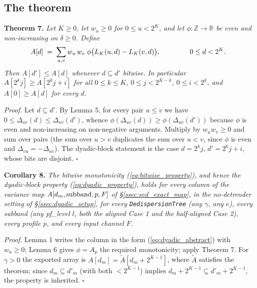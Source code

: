 \documentclass{article}
\numberwithin{equation}{section}   %
\begin{document}
\subsection{The theorem}
\label{ssec:dyadic_theorem}

\par\noindent
{\bf Theorem 7.}
{\em Let $K \ge 0$, let $w_u \ge 0$ for $0 \le u < 2^K$, and let
$\phi : \mathbb{Z} \rightarrow \mathbb{R}$ be even and non-increasing on $\delta \ge 0$.
Define}
\begin{equation}
A[d] \;=\; \sum_{u,v} w_u \, w_v \; \phi\big( L_K(u,d) - L_K(v,d) \big),
  \hspace{1.5cm} 0 \le d < 2^K.
\label{eq:dyadic_abstract}
\end{equation}
{\em Then $A[d'] \le A[d]$ whenever $d \subseteq d'$ bitwise. In particular
$A[2^kj] \ge A[2^kj+i]$ for all $0 \le k \le K$, $0 \le j < 2^{K-k}$, $0 \le i < 2^k$, and
$A[0] \ge A[d]$ for every $d$.}

\medskip
\par\noindent
{\em Proof.} Let $d \subseteq d'$. By Lemma 5, for every pair $u \le v$ we have
$0 \le \Delta_{uv}(d) \le \Delta_{uv}(d')$, whence $\phi(\Delta_{uv}(d)) \ge
\phi(\Delta_{uv}(d'))$ because $\phi$ is even and non-increasing on non-negative arguments.
Multiply by $w_uw_v \ge 0$ and sum over pairs (the sum over $u>v$ duplicates the sum over
$u<v$, since $\phi$ is even and $\Delta_{vu} = -\Delta_{uv}$). The dyadic-block statement is
the case $d = 2^kj$, $d' = 2^kj+i$, whose bits are disjoint. $\square$

\medskip
\par\noindent
{\bf Corollary 8.}
{\em The bitwise monotonicity (\ref{eq:bitwise_property}), and hence the dyadic-block property
(\ref{eq:dyadic_property}), holds for every column of the variance map
$A[d_m, \mbox{\rm subband}, p, F]$ of \S\ref{ssec:svd_exact_map}, in the no-detrender setting
of \S\ref{ssec:dyadic_setup}, for every {\tt DedispersionTree} (any $\gamma$, any $e$), every
subband (any pf\_level $l$, both the aligned Case 1 and the half-aligned Case 2), every
profile $p$, and every input channel $F$.}

\medskip
\par\noindent
{\em Proof.} Lemma 1 writes the column in the form (\ref{eq:dyadic_abstract}) with
$w_u \ge 0$; Lemma 6 gives $\phi = A_p$ the required monotonicity; apply Theorem 7. For
$\gamma>0$ the exported array is $A[d_m] = \tilde A[d_m + 2^{K-1}]$, where $\tilde A$
satisfies the theorem; since $d_m \subseteq d'_m$ (with both $< 2^{K-1}$) implies
$d_m + 2^{K-1} \subseteq d'_m + 2^{K-1}$, the property is inherited. $\square$
\end{document}
